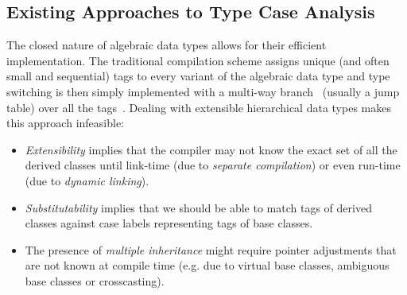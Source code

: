 
\subsection{Existing Approaches to Type Case Analysis}
\label{sec:prev}

The closed nature of algebraic data types allows for their efficient 
implementation. The traditional compilation scheme assigns unique (and often 
small and sequential) tags to every variant of the algebraic data type and type 
switching is then simply implemented with a multi-way branch~\cite{Spuler94} 
(usually a jump table) over all the tags~\cite{Augustsson85}. Dealing with 
extensible hierarchical data types makes this %
approach infeasible:

\begin{itemize}
\setlength{\itemsep}{0pt}
\setlength{\parskip}{0pt}
\item \emph{Extensibility} implies that the compiler may not know the exact set 
      of all the derived classes until link-time (due to \emph{separate compilation}) 
      or even run-time (due to \emph{dynamic linking}).
\item \emph{Substitutability} implies that we should be able to 
      match tags of derived classes against case labels representing tags of 
      base classes.
\item The presence of \emph{multiple inheritance} might require pointer adjustments 
      that are not known at compile time (e.g. due to virtual base classes, 
      ambiguous base classes or crosscasting).
\end{itemize}

%

